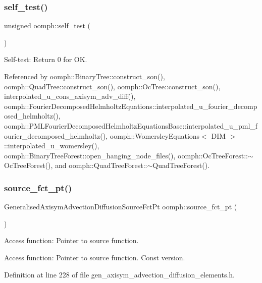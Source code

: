 \subsubsection{\texorpdfstring{self\+\_\+test()}{self\_test()}}
{\footnotesize\ttfamily unsigned oomph\+::self\+\_\+test (\begin{DoxyParamCaption}{ }\end{DoxyParamCaption})}



Self-\/test\+: Return 0 for OK. 



Referenced by oomph\+::\+Binary\+Tree\+::construct\+\_\+son(), oomph\+::\+Quad\+Tree\+::construct\+\_\+son(), oomph\+::\+Oc\+Tree\+::construct\+\_\+son(), interpolated\+\_\+u\+\_\+cons\+\_\+axisym\+\_\+adv\+\_\+diff(), oomph\+::\+Fourier\+Decomposed\+Helmholtz\+Equations\+::interpolated\+\_\+u\+\_\+fourier\+\_\+decomposed\+\_\+helmholtz(), oomph\+::\+P\+M\+L\+Fourier\+Decomposed\+Helmholtz\+Equations\+Base\+::interpolated\+\_\+u\+\_\+pml\+\_\+fourier\+\_\+decomposed\+\_\+helmholtz(), oomph\+::\+Womersley\+Equations$<$ D\+I\+M $>$\+::interpolated\+\_\+u\+\_\+womersley(), oomph\+::\+Binary\+Tree\+Forest\+::open\+\_\+hanging\+\_\+node\+\_\+files(), oomph\+::\+Oc\+Tree\+Forest\+::$\sim$\+Oc\+Tree\+Forest(), and oomph\+::\+Quad\+Tree\+Forest\+::$\sim$\+Quad\+Tree\+Forest().

\mbox{\label{namespaceoomph_aaeb31b697ac413871cfe74e70c3a60b1}} 
\subsubsection{\texorpdfstring{source\+\_\+fct\+\_\+pt()}{source\_fct\_pt()}}
{\footnotesize\ttfamily Generalised\+Axisym\+Advection\+Diffusion\+Source\+Fct\+Pt oomph\+::source\+\_\+fct\+\_\+pt (\begin{DoxyParamCaption}{ }\end{DoxyParamCaption})}



Access function\+: Pointer to source function. 

Access function\+: Pointer to source function. Const version. 

Definition at line 228 of file gen\+\_\+axisym\+\_\+advection\+\_\+diffusion\+\_\+elements.\+h.



